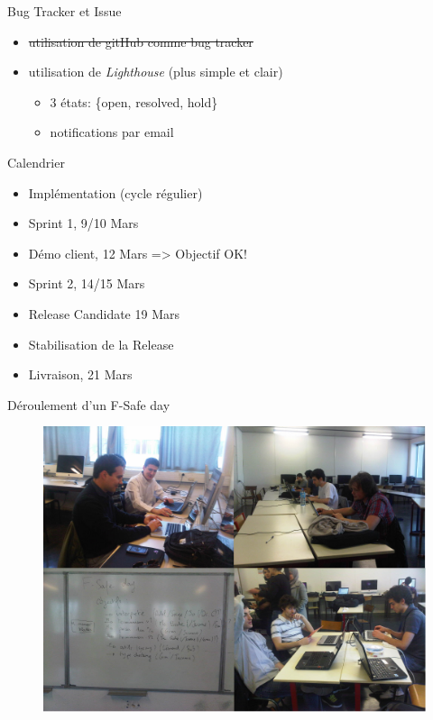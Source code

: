 \begin{frame}{Bug Tracker et Issue}
  \begin{block}{}
    \begin{itemize}
      \item \sout{utilisation de gitHub comme bug tracker}
      \item utilisation de \emph{Lighthouse} (plus simple et clair)
        \begin{itemize}
          \item 3 états: \{open, resolved, hold\}
          \item notifications par email
        \end{itemize}
    \end{itemize}
  \end{block}
\end{frame}

\begin{frame}{Calendrier}
  \begin{itemize}
    \item Implémentation (cycle régulier) 
    \item Sprint 1, 9/10 Mars
    \item Démo client, 12 Mars => Objectif OK!
    \item Sprint 2, 14/15 Mars
    \item Release Candidate 19 Mars
    \item Stabilisation de la Release
    \item Livraison, 21 Mars
  \end{itemize}
\end{frame}

\begin{frame}{Déroulement d'un F-Safe day}
  \begin{figure}
    \includegraphics[scale=0.27]{img/FSafeDay.png}
  \end{figure} 
\end{frame}

